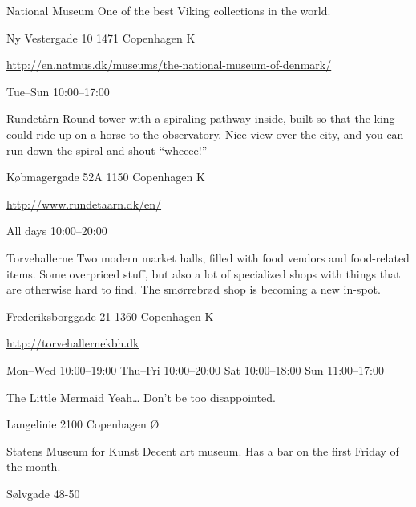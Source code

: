 \begin{left}
\begin{funitem}
{National Museum}
{One of the best Viking collections in the world.}
{\begin{addr}
{Ny Vestergade 10}
{1471 Copenhagen K}
\end{addr}}
{\url{http://en.natmus.dk/museums/the-national-museum-of-denmark/}}
{\begin{ohours}
{Tue–Sun}
{10:00–17:00}
{}
{}
{}
{}
{}
{}
\end{ohours}}
\end{funitem}
\begin{funitem}
{Rundetårn}
{Round tower with a spiraling pathway inside, built so that the king could ride up on a horse to the observatory. Nice view over the city, and you can run down the spiral and shout “wheeee!” }
{\begin{addr}
{Købmagergade 52A}
{1150 Copenhagen K}
\end{addr}}
{\url{http://www.rundetaarn.dk/en/}}
{\begin{ohours}
{All days}
{10:00–20:00}
{}
{}
{}
{}
{}
{}
\end{ohours}}
\end{funitem}
\begin{funitem}
{Torvehallerne}
{Two modern market halls, filled with food vendors and food-related items. Some overpriced stuff, but also a lot of specialized shops with things that are otherwise hard to find. The smørrebrød shop is becoming a new in-spot.}
{\begin{addr}
{Frederiksborggade 21}
{1360 Copenhagen K}
\end{addr}}
{\url{http://torvehallernekbh.dk}}
{\begin{ohours}
{Mon–Wed}
{10:00–19:00}
{Thu–Fri}
{10:00–20:00}
{Sat}
{10:00–18:00}
{Sun}
{11:00–17:00}
\end{ohours}}
\end{funitem}
\begin{funitemwourl}
{The Little Mermaid}
{Yeah… Don’t be too disappointed.}
{\begin{addr}
{Langelinie}
{2100 Copenhagen Ø}
\end{addr}}
{}
{\begin{ohours}
{}
{}
{}
{}
{}
{}
{}
{}
\end{ohours}}
\end{funitemwourl}
\begin{funitem}
{Statens Museum for Kunst}
{Decent art museum. Has a bar on the first Friday of the month.}
{\begin{addr}
{Sølvgade 48-50}

\end{addr}}
\end{funitem}
\end{left}
